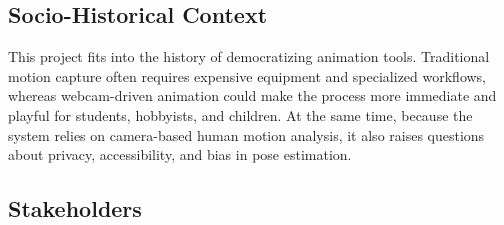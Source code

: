 \subsection*{Socio-Historical Context}

This project fits into the history of democratizing animation tools. Traditional motion capture often requires expensive equipment and specialized workflows, whereas webcam-driven animation could make the process more immediate and playful for students, hobbyists, and children. At the same time, because the system relies on camera-based human motion analysis, it also raises questions about privacy, accessibility, and bias in pose estimation.




\subsection*{Stakeholders}

